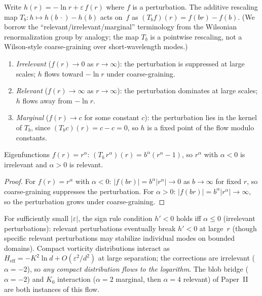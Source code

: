 \begin{proposition}
\label{prop:rg-classification}
Write $h(r) = -\ln r + \varepsilon\,f(r)$ where $f$ is a perturbation.
The additive rescaling map
$T_b\colon h \mapsto h(b\,\cdot) - h(b)$ acts on~$f$ as
$(T_b f)(r) = f(br) - f(b)$.
(We borrow the ``relevant/irrelevant/marginal'' terminology from
the Wilsonian renormalization group by analogy; the map $T_b$ is
a pointwise rescaling, not a Wilson-style coarse-graining over
short-wavelength modes.)
\begin{enumerate}
  \item \emph{Irrelevant} ($f(r) \to 0$ as $r \to \infty$):
    the perturbation is suppressed at large scales;
    $h$ flows toward $-\ln r$ under coarse-graining.
  \item \emph{Relevant} ($f(r) \to \infty$ as $r \to \infty$):
    the perturbation dominates at large scales;
    $h$ flows away from $-\ln r$.
  \item \emph{Marginal} ($f(r) \to c$ for some constant $c$):
    the perturbation lies in the kernel of $T_b$,
    since $(T_b c)(r) = c - c = 0$, so $h$ is a fixed
    point of the flow modulo constants.
\end{enumerate}
Eigenfunctions $f(r) = r^\alpha$:
$(T_b\, r^\alpha)(r) = b^\alpha(r^\alpha - 1)$,
so $r^\alpha$ with $\alpha < 0$ is irrelevant and
$\alpha > 0$ is relevant.
\end{proposition}

\begin{proof}
For $f(r) = r^\alpha$ with $\alpha < 0$:
$|f(br)| = b^\alpha |r^\alpha| \to 0$ as $b \to \infty$ for
fixed $r$, so coarse-graining suppresses the perturbation.
For $\alpha > 0$: $|f(br)| = b^\alpha |r^\alpha| \to \infty$,
so the perturbation grows under coarse-graining.
\end{proof}

\noindent
For sufficiently small $|\varepsilon|$, the sign rule condition
$h' < 0$ holds iff $\alpha \le 0$ (irrelevant perturbations):
relevant perturbations eventually break $h' < 0$ at large~$r$
(though specific relevant perturbations may stabilize individual modes
on bounded domains).
Compact vorticity distributions interact as
$H_{\mathrm{eff}} = -K^2\ln d + O(\varepsilon^2/d^2)$ at large
separation; the corrections are irrelevant ($\alpha = -2$),
so \emph{any compact distribution flows to the logarithm}.
The blob bridge ($\alpha = -2$) and $K_0$ interaction
($\alpha = 2$ marginal, then $\alpha = 4$ relevant) of Paper~II
are both instances of this flow.

